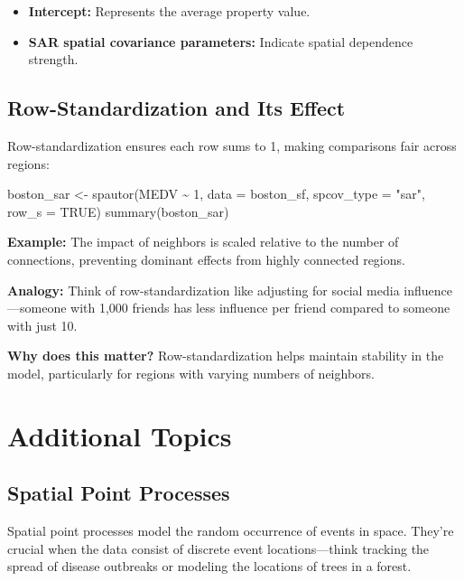 \documentclass[
  11pt,
]{report}
\newenvironment{Shaded}{\begin{snugshade}}{\end{snugshade}}
\newcommand{\AttributeTok}[1]{\textcolor[rgb]{0.40,0.45,0.13}{#1}}
\newcommand{\ConstantTok}[1]{\textcolor[rgb]{0.56,0.35,0.01}{#1}}
\newcommand{\DecValTok}[1]{\textcolor[rgb]{0.68,0.00,0.00}{#1}}
\newcommand{\FunctionTok}[1]{\textcolor[rgb]{0.28,0.35,0.67}{#1}}
\newcommand{\NormalTok}[1]{\textcolor[rgb]{0.00,0.23,0.31}{#1}}
\newcommand{\OtherTok}[1]{\textcolor[rgb]{0.00,0.23,0.31}{#1}}
\newcommand{\SpecialCharTok}[1]{\textcolor[rgb]{0.37,0.37,0.37}{#1}}
\newcommand{\StringTok}[1]{\textcolor[rgb]{0.13,0.47,0.30}{#1}}
\providecommand{\tightlist}{%
  \setlength{\itemsep}{0pt}\setlength{\parskip}{0pt}}\usepackage{longtable,booktabs,array}
\begin{document}
\begin{itemize}
\tightlist
\item
  \textbf{Intercept:} Represents the average property value.
\item
  \textbf{SAR spatial covariance parameters:} Indicate spatial
  dependence strength.
\end{itemize}

\section{Row-Standardization and Its
Effect}\label{row-standardization-and-its-effect}

Row-standardization ensures each row sums to 1, making comparisons fair
across regions:

\begin{Shaded}
\begin{Highlighting}[]
\NormalTok{boston\_sar }\OtherTok{\textless{}{-}} \FunctionTok{spautor}\NormalTok{(MEDV }\SpecialCharTok{\textasciitilde{}} \DecValTok{1}\NormalTok{, }\AttributeTok{data =}\NormalTok{ boston\_sf, }\AttributeTok{spcov\_type =} \StringTok{"sar"}\NormalTok{, }\AttributeTok{row\_s =} \ConstantTok{TRUE}\NormalTok{)}
\FunctionTok{summary}\NormalTok{(boston\_sar)}
\end{Highlighting}
\end{Shaded}

\textbf{Example:} The impact of neighbors is scaled relative to the
number of connections, preventing dominant effects from highly connected
regions.

\textbf{Analogy:} Think of row-standardization like adjusting for social
media influence---someone with 1,000 friends has less influence per
friend compared to someone with just 10.

\textbf{Why does this matter?} Row-standardization helps maintain
stability in the model, particularly for regions with varying numbers of
neighbors.

\chapter{Additional Topics}\label{additional-topics}

\section{Spatial Point Processes}\label{spatial-point-processes}

Spatial point processes model the random occurrence of events in space.
They're crucial when the data consist of discrete event
locations---think tracking the spread of disease outbreaks or modeling
the locations of trees in a forest.
\end{document}
